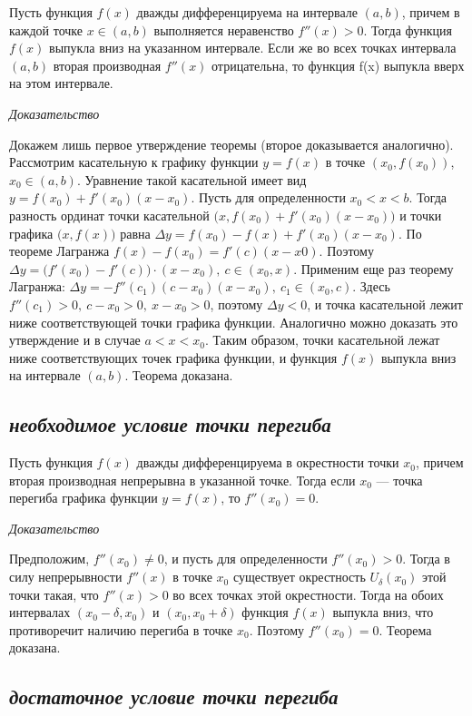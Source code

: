 Пусть функция $f(x)$ дважды дифференцируема на интервале $(a, b)$, причем в каждой точке $x \in (a, b)$ выполняется неравенство $f''(x) > 0$. Тогда функция $f(x)$ выпукла вниз на указанном интервале. Если же во всех точках интервала $(a, b)$ вторая производная $f''(x)$ отрицательна, то функция f(x) выпукла вверх на этом интервале.

\textit{Доказательство}

Докажем лишь первое утверждение теоремы (второе доказывается аналогично). Рассмотрим касательную к графику функции $y = f(x)$ в точке $(x_0, f(x_0))$, $x_0 \in (a, b)$. Уравнение такой касательной имеет вид $y = f(x_0) + f'(x_0)(x − x_0)$. Пусть для определенности $x_0 < x < b$. Тогда разность ординат точки касательной $\big(x, f(x_0) + f'(x_0)(x − x_0)\big)$ и точки графика $\big(x, f(x)\big)$ равна $\Delta y = f(x_0) − f(x) + f'(x_0)(x − x_0).$ По теореме Лагранжа $f(x) − f(x_0) = f'(c)(x − x0).$ Поэтому $\Delta y = \big(f'(x_0) − f'(c)\big)\cdot(x − x_0), \ c \in (x_0, x).$ Применим еще раз теорему Лагранжа: $\Delta y = −f''(c_1)(c − x_0)(x − x_0),\ c_1 \in (x_0, c).$ Здесь $f''(c_1) > 0,\ c − x_0 > 0, \ x − x_0 > 0$, поэтому $\Delta y < 0$, и точка касательной лежит ниже соответствующей точки графика функции. Аналогично можно доказать это утверждение и в случае $a < x < x_0$. Таким образом, точки касательной лежат ниже соответствующих точек графика функции, и функция $f(x)$ выпукла вниз на интервале $(a, b)$. Теорема доказана.
\subsection{\textit{необходимое условие точки перегиба}}

Пусть функция $f(x)$ дважды дифференцируема в окрестности точки $x_0$, причем вторая производная непрерывна в указанной точке. Тогда если $x_0$ — точка перегиба графика функции $y = f(x)$, то $f''(x_0) = 0.$

\textit{Доказательство}

Предположим, $f''(x_0) \neq 0$, и пусть для определенности $f''(x_0) > 0$. Тогда в силу непрерывности $f
''(x)$ в точке $x_0$ существует окрестность $U_\delta(x_0)$ этой точки такая, что $f
''(x) > 0$ во всех точках этой окрестности. Тогда на обоих интервалах $(x_0 − \delta, x_0)$ и $(x_0, x_0 + \delta)$ функция $f(x)$ выпукла вниз, что противоречит наличию перегиба в точке $x_0$. Поэтому $f''(x_0) = 0$. Теорема доказана.
\subsection{\textit{достаточное условие точки перегиба}}

